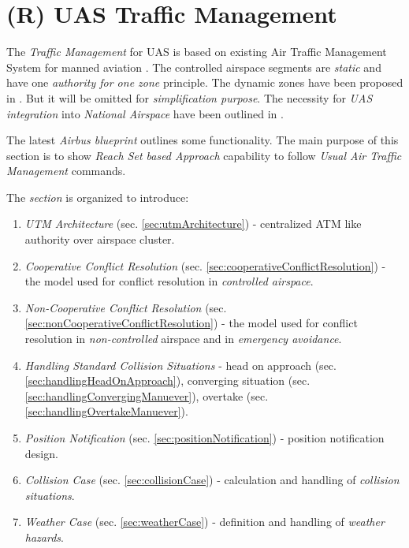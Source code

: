 \newpage
\section{(R) UAS Traffic Management}\label{sec:UASTrafficManagement}

The \emph{Traffic Management} for UAS is based on existing Air Traffic Management System for manned aviation \cite{icao4444}. The controlled airspace segments are \emph{static} and have one \emph{authority for one zone} principle. The dynamic zones have been proposed in \cite{gerdes2016dynamic}. But it will be omitted for \emph{simplification purpose}. The necessity for \emph{UAS integration} into \emph{National Airspace} have been outlined in \cite{spriesterbach2013unmanned}.

The latest \emph{Airbus blueprint} \cite{airbusUTM2018blueprint} outlines some functionality. The main purpose of this section is to show \emph{Reach Set based Approach} capability to follow \emph{Usual Air Traffic Management} commands.

The \emph{section} is organized to introduce:
\begin{enumerate}
    \item \emph{UTM Architecture} (sec. \ref{sec:utmArchitecture}) - centralized ATM like authority over airspace cluster.
    
    \item \emph{Cooperative Conflict Resolution} (sec. \ref{sec:cooperativeConflictResolution}) - the model used for conflict resolution in \emph{controlled airspace}.
    
    \item \emph{Non-Cooperative Conflict Resolution} (sec. \ref{sec:nonCooperativeConflictResolution})  - the model used for conflict resolution in \emph{non-controlled} airspace and in \emph{emergency avoidance}.
    
    \item \emph{Handling Standard Collision Situations} - head on approach (sec. \ref{sec:handlingHeadOnApproach}), converging situation (sec. \ref{sec:handlingConvergingManuever}), overtake (sec. \ref{sec:handlingOvertakeManuever}).
    
    \item \emph{Position Notification} (sec. \ref{sec:positionNotification}) - position notification design.
    
    \item \emph{Collision Case} (sec. \ref{sec:collisionCase}) - calculation and handling of \emph{collision situations}.
    
    \item \emph{Weather Case} (sec. \ref{sec:weatherCase}) - definition and handling of \emph{weather hazards}.
\end{enumerate}